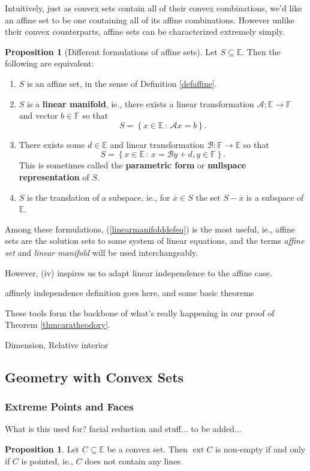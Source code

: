 \documentclass[11pt]{article}
\numberwithin{equation}{section}
\theoremstyle{definition}
\newtheorem{proposition}[theorem]{Proposition}
\newcommand{\bE}{\mathbb{E}}
\newcommand{\bF}{\mathbb{F}}
\newcommand{\cA}{\mathcal{A}}
\newcommand{\cB}{\mathcal{B}}
\newcommand{\set}[2]{\left\{#1\,:\,#2\right\}}
\newcommand{\ext}{\operatorname{ext}}
\begin{document}
Intuitively, just as convex sets contain all of their convex combinations, we'd like an affine set to be one containing all of its affine combinations. However unlike their convex counterparts, affine sets can be characterized extremely simply. 
\begin{proposition}[Different formulations of affine sets]
    Let $S\subseteq\bE$. Then the following are equivalent:
    \begin{enumerate}[label=(\roman*)]
        \item $S$ is an affine set, in the sense of Definition \ref{defaffine}.
        \item $S$ is a \textbf{linear manifold}, ie., there exists a linear transformation $\cA:\bE\to\bF$ and vector $b\in\bF$ so that
        \begin{equation}
            \label{linearmanifolddefeq}
            S=\set{x\in\bE}{\cA x=b}.
        \end{equation}
        \item There exists some $d\in\bE$ and linear transformation $\cB:\bF\to\bE$ so that
        \begin{equation}
            S=\set{x\in\bE}{x=\cB y+d, y\in\bF}.
        \end{equation}
        This is sometimes called the \textbf{parametric form} or \textbf{nullspace representation} of $S$.
        \item $S$ is the translation of a subspace, ie., for $\overline x\in S$ the set $S-\overline x$ is a subspace of $\bE$.
    \end{enumerate}
\end{proposition}
Among these formulations, (\ref{linearmanifolddefeq}) is the most useful, ie., affine sets are the solution sets to some system of linear equations, and the terms \textit{affine set} and \textit{linear manifold} will be used interchangeably.

However, (iv) inspires us to adapt linear independence to the affine case. 

affinely independence definition goes here, and some basic theorems

These tools form the backbone of what's really happening in our proof of Theorem \ref{thmcaratheodory}.

Dimension, Relative interior
\subsection{Geometry with Convex Sets}
\subsubsection{Extreme Points and Faces}
What is this used for? facial reduction and stuff... to be added...
\begin{proposition}
    Let $C\subseteq\bE$ be a convex set. Then $\ext C$ is non-empty if and only if $C$ is pointed, ie., $C$ does not contain any lines.
\end{proposition}
\end{document}
